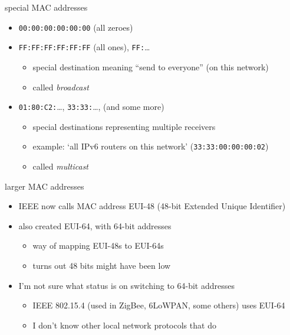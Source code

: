 \begin{frame}{special MAC addresses}
    \begin{itemize}
    \item \texttt{00:00:00:00:00:00} (all zeroes)
    \item \texttt{FF:FF:FF:FF:FF:FF} (all ones), \texttt{FF:}\ldots
        \begin{itemize}
        \item special destination meaning ``send to everyone'' (on this network)
        \item called \textit{broadcast}
        \end{itemize}
    \item \texttt{01:80:C2:}\ldots, \texttt{33:33:}\ldots, (and some more)
        \begin{itemize}
        \item special destinations representing multiple receivers
        \item example: `all IPv6 routers on this network' (\texttt{33:33:00:00:00:02})
        \item called \textit{multicast}
        \end{itemize}
    \end{itemize}
\end{frame}

\begin{frame}{larger MAC addresses}
    \begin{itemize}
    \item IEEE now calls MAC address EUI-48 (48-bit Extended Unique Identifier)
    \vspace{.5cm}
    \item also created EUI-64, with 64-bit addresses
        \begin{itemize}
        \item way of mapping EUI-48s to EUI-64s
        \item turns out 48 bits might have been low
        \end{itemize}
    \item I'm not sure what status is on switching to 64-bit addresses
        \begin{itemize}
        \item IEEE 802.15.4 (used in ZigBee, 6LoWPAN, some others) uses EUI-64
        \item I don't know other local network protocols that do
        \end{itemize}
    \end{itemize}
\end{frame}
